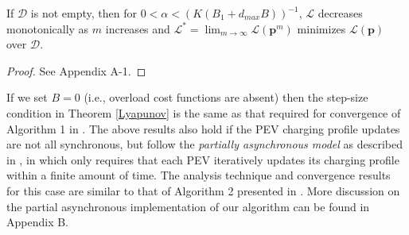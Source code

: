 \documentclass[12pt,draftcls,onecolumn]{IEEEtran}
\begin{document}
\begin{Thm}
If $\mathcal{D}$ is not empty, then for $0 < \alpha < (K(B_1+d_{max}B))^{-1}$, $\mathcal{L}$ decreases monotonically as $m$ increases and $\mathcal{L}^{*}=\lim_{m \rightarrow \infty}\mathcal{L}(\mathbf{p}^m)$ minimizes $\mathcal{L}(\mathbf{p})$ over $\mathcal{D}$.\\
\label{Lyapunov}
\end{Thm}
\begin{proof}
See Appendix A-1.
\end{proof}
If we set $B = 0$ (i.e., overload cost functions are absent) then the step-size condition in Theorem \ref{Lyapunov} is the same as that required for convergence of Algorithm 1 in \cite{GTL13}. The above results also hold if the PEV charging profile updates are not all synchronous, but follow the \textit{partially asynchronous model} as described in \cite{BT89}, in which only requires that each PEV iteratively updates its charging profile within a finite amount of time. The analysis technique and convergence results for this case are similar to that of Algorithm 2 presented in \cite{GTL13}. More discussion on the partial asynchronous implementation of our algorithm can be found in Appendix B.
\end{document}
